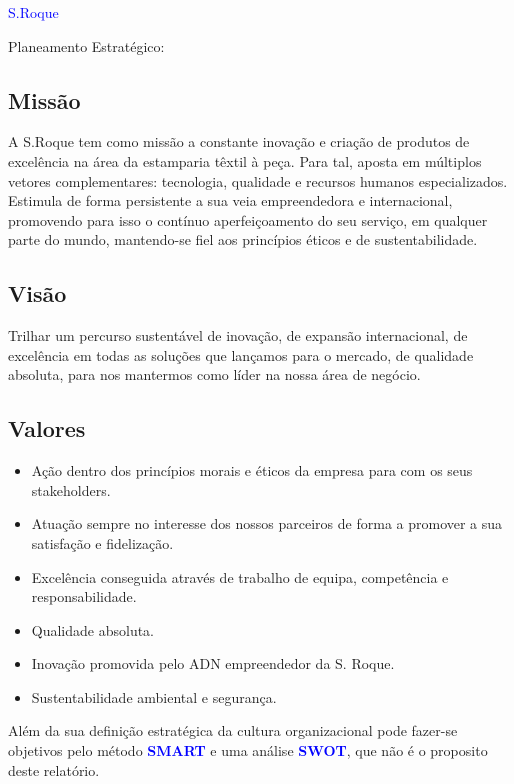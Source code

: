 {\textcolor{blue}{\Large{S.Roque}}

Planeamento Estratégico:

\subsection{Missão}

A S.Roque tem como missão a constante inovação e criação de produtos de excelência na área da estamparia têxtil à peça. Para tal, aposta em múltiplos vetores complementares: tecnologia, qualidade e recursos humanos especializados. Estimula de forma persistente a sua veia empreendedora e internacional, promovendo para isso o contínuo aperfeiçoamento do seu serviço, em qualquer parte do mundo, mantendo-se fiel aos princípios éticos e de sustentabilidade.

\subsection{Visão}
Trilhar um percurso sustentável de inovação, de expansão internacional, de excelência em todas as soluções que lançamos para o mercado, de qualidade absoluta, para nos mantermos como líder na nossa área de negócio.

\subsection{Valores}
\begin{itemize}
\setlength\itemsep{-0.3em}
\item Ação dentro dos princípios morais e éticos da empresa para com os seus stakeholders.
\item Atuação sempre no interesse dos nossos parceiros de forma a promover a sua satisfação e fidelização.
\item Excelência conseguida através de trabalho de equipa, competência e responsabilidade.
\item Qualidade absoluta.
\item Inovação promovida pelo ADN empreendedor da S. Roque.
\item Sustentabilidade ambiental e segurança.
\end{itemize}\par

Além da sua definição estratégica da cultura organizacional pode fazer-se objetivos pelo método \textcolor{blue}{\textbf{SMART}} e uma análise \textcolor{blue}{\textbf{SWOT}}, que não é o proposito deste relatório.\\





}
